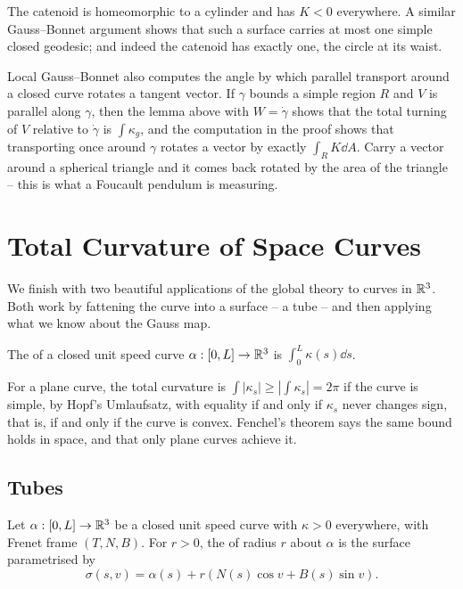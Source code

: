 \documentclass[a4paper]{scrartcl}
\begin{document}
\begin{example}
    The catenoid is homeomorphic to a cylinder and has $K < 0$ everywhere. A similar Gauss--Bonnet argument shows that such a surface carries at most one simple closed geodesic; and indeed the catenoid has exactly one, the circle at its waist.
\end{example}

\begin{remark}
    Local Gauss--Bonnet also computes the angle by which parallel transport around a closed curve rotates a tangent vector. If $\gamma$ bounds a simple region $R$ and $V$ is parallel along $\gamma$, then the lemma above with $W = \dot\gamma$ shows that the total turning of $V$ relative to $\dot\gamma$ is $\int\kappa_g$, and the computation in the proof shows that transporting once around $\gamma$ rotates a vector by exactly $\int_R K \dd A$. Carry a vector around a spherical triangle and it comes back rotated by the area of the triangle -- this is what a Foucault pendulum is measuring.
\end{remark}

\section{Total Curvature of Space Curves}

We finish with two beautiful applications of the global theory to curves in $\mathbb{R}^3$. Both work by fattening the curve into a surface -- a tube -- and then applying what we know about the Gauss map.

\begin{definition}
    The  of a closed unit speed curve $\alpha: [0,L] \rightarrow \mathbb{R}^3$ is $\int_0^L \kappa(s)\dd s$.
\end{definition}

For a plane curve, the total curvature is $\int|\kappa_s| \geq |\int\kappa_s| = 2\pi$ if the curve is simple, by Hopf's Umlaufsatz, with equality if and only if $\kappa_s$ never changes sign, that is, if and only if the curve is convex. Fenchel's theorem says the same bound holds in space, and that only plane curves achieve it.

\subsection{Tubes}

\begin{definition}[Tube]
    Let $\alpha: [0,L] \rightarrow \mathbb{R}^3$ be a closed unit speed curve with $\kappa > 0$ everywhere, with Frenet frame $(T, N, B)$. For $r > 0$, the  of radius $r$ about $\alpha$ is the surface parametrised by
    $$
    \sigma(s, v) = \alpha(s) + r\left(N(s)\cos v + B(s)\sin v\right).
    $$
\end{definition}
\end{document}
